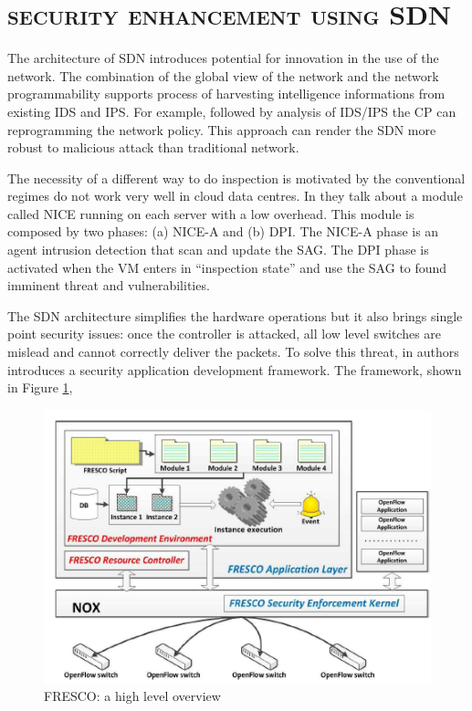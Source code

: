 \section*{\small \textsc{security enhancement using \ac{SDN}}}
The architecture of \ac{SDN} introduces potential for innovation in the use of the network. The combination of the global view of the network and the network programmability supports process of harvesting intelligence informations from existing \ac{IDS} and \ac{IPS}. For example, followed by analysis of \ac{IDS}/\ac{IPS} the \ac{CP} can reprogramming the network policy. This approach can render the \ac{SDN} more robust to malicious attack than traditional network.

The necessity of a different way to do inspection is motivated by the conventional regimes do not work very well in cloud data centres. In \cite{sdn-and-openflow-from-concept-to-implementation:NICE} they talk about a module called \ac{NICE} running on each server with a low overhead. This module is composed by two phases: (a) \ac{NICE}-A and (b) \ac{DPI}. The \ac{NICE}-A phase is an agent intrusion detection that scan and update the \ac{SAG}. The \ac{DPI} phase is activated when the \ac{VM} enters in ``inspection state'' and use the \ac{SAG} to found imminent threat and vulnerabilities.

The \ac{SDN} architecture simplifies the hardware operations but it also brings single point security issues: once the controller is attacked, all low level switches are mislead and cannot correctly deliver the packets. To solve this threat, in \cite{fresco-services} authors introduces a security application development framework. The framework, shown in Figure \ref{fig:security-enhancement-using-SDN:FRESCO},

\begin{figure}
\centering
\includegraphics[scale=0.5]{Introduction/Image/FrescoStructure.png}
\caption{FRESCO: a high level overview}
\label{fig:security-enhancement-using-SDN:FRESCO}
\end{figure}

